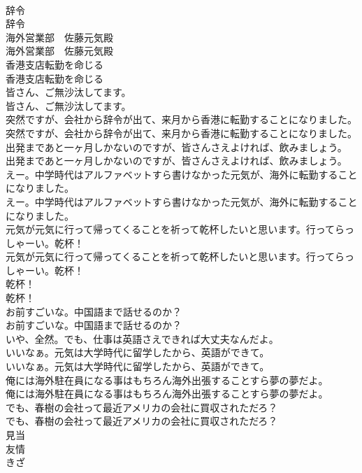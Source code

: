 \documentclass[8pt]{extreport}
\begin{document}
\begin{CJK}{UTF8}{min}
\\	辞令	
\\	辞令 
\\	海外営業部　佐藤元気殿	
\\	海外営業部　佐藤元気殿 
\\	香港支店転勤を命じる	
\\	香港支店転勤を命じる 
\\	皆さん、ご無沙汰してます。	
\\	皆さん、ご無沙汰してます。 
\\	突然ですが、会社から辞令が出て、来月から香港に転勤することになりました。	
\\	突然ですが、会社から辞令が出て、来月から香港に転勤することになりました。 
\\	出発まであと一ヶ月しかないのですが、皆さんさえよければ、飲みましょう。	
\\	出発まであと一ヶ月しかないのですが、皆さんさえよければ、飲みましょう。 
\\	えー。中学時代はアルファベットすら書けなかった元気が、海外に転勤することになりました。	
\\	えー。中学時代はアルファベットすら書けなかった元気が、海外に転勤することになりました。 
\\	元気が元気に行って帰ってくることを祈って乾杯したいと思います。行ってらっしゃーい。乾杯！	
\\	元気が元気に行って帰ってくることを祈って乾杯したいと思います。行ってらっしゃーい。乾杯！ 
\\	乾杯！	
\\	乾杯！ 
\\	お前すごいな。中国語まで話せるのか？	
\\	お前すごいな。中国語まで話せるのか？ 
\\	いや、全然。でも、仕事は英語さえできれば大丈夫なんだよ。 
\\	いいなぁ。元気は大学時代に留学したから、英語ができて。	
\\	いいなぁ。元気は大学時代に留学したから、英語ができて。 
\\	俺には海外駐在員になる事はもちろん海外出張することすら夢の夢だよ。	
\\	俺には海外駐在員になる事はもちろん海外出張することすら夢の夢だよ。 
\\	でも、春樹の会社って最近アメリカの会社に買収されただろ？	
\\	でも、春樹の会社って最近アメリカの会社に買収されただろ？ 
\\	見当
\\	友情
\\	きざ

\end{CJK}
\end{document}
